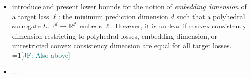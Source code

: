 \documentclass[11pt]{article}
\newcommand{\Comments}{1}
\newcommand{\mynote}[2]{\ifnum\Comments=1\textcolor{#1}{#2}\fi}
\newcommand{\jessie}[1]{\mynote{teal}{[JF: #1]}}
\newcommand{\reals}{\mathbb{R}}
\newcommand{\Y}{\mathcal{Y}}
\begin{document}
\begin{itemize}
\item
  \citet{finocchiaro2020embedding} introduce and present lower bounds for the notion of \emph{embedding dimension} of a target loss $\ell$: the minimum prediction dimension $d$ such that a polyhedral surrogate $L:\reals^d\to \reals^\Y_+$ embeds $\ell$.
  However, it is unclear if convex consistency dimension restricting to polyhedral losses, embedding dimension, or unrestricted convex consistency dimension are equal for all target losses. \jessie{Also above}

\item
  ...
\end{itemize}

%
%

\end{document}
